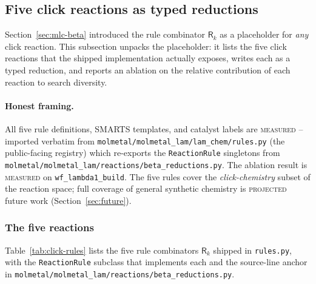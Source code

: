 \subsection{Five click reactions as typed reductions}
\label{sec:click-chem}

Section~\ref{sec:mlc-beta} introduced the rule combinator
$\mathsf{R}_{k}$ as a placeholder for \emph{any} click reaction.
This subsection unpacks the placeholder: it lists the five click
reactions that the shipped implementation actually exposes,
writes each as a typed reduction, and reports an ablation on the
relative contribution of each reaction to search diversity.

\paragraph{Honest framing.}
All five rule definitions, SMARTS templates, and catalyst labels
are \textsc{measured} -- imported verbatim from
\texttt{molmetal/molmetal\_lam/lam\_chem/rules.py} (the
public-facing registry) which re-exports the
\texttt{ReactionRule} singletons from
\texttt{molmetal/molmetal\_lam/reactions/beta\_reductions.py}.
The ablation result is \textsc{measured} on
\texttt{wf\_lambda1\_build}. The five rules cover the
\emph{click-chemistry} subset of the reaction space; full
coverage of general synthetic chemistry is \textsc{projected}
future work (Section~\ref{sec:future}).

\subsubsection{The five reactions}
\label{sec:click-chem-five}

Table~\ref{tab:click-rules} lists the five rule combinators
$\mathsf{R}_{k}$ shipped in \texttt{rules.py}, with the
\texttt{ReactionRule} subclass that implements each and the
source-line anchor in
\texttt{molmetal/molmetal\_lam/reactions/beta\_reductions.py}.

